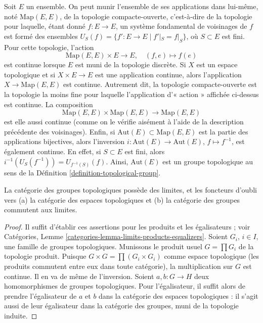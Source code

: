\begin{example}
\label{example-automorphisms-of-a-set}
Soit $E$ un ensemble. On peut munir l'ensemble de ses applications dans
lui-même, noté $\text{Map}(E, E)$, de la topologie compacte-ouverte,
c'est-à-dire de la topologie pour laquelle, étant donné $f : E \to E$, un
système fondamental de voisinages de $f$ est formé des ensembles
$U_S(f) = \{f' : E \to E \mid f'|_S = f|_S\}$, où $S \subset E$ est fini.
Pour cette topologie, l'action
$$
\text{Map}(E, E) \times E \longrightarrow E,\quad
(f, e) \longmapsto f(e)
$$
est continue lorsque $E$ est muni de la topologie discrète. Si $X$ est un
espace topologique et si $X \times E \to E$ est une application continue,
alors l'application $X \to \text{Map}(E, E)$ est continue. Autrement dit, la
topologie compacte-ouverte est la topologie la moins fine pour laquelle
l'application d'« action » affichée ci-dessus est continue. La composition
$$
\text{Map}(E, E) \times \text{Map}(E, E) \to \text{Map}(E, E)
$$
est elle aussi continue (comme on le vérifie aisément à l'aide de la
description précédente des voisinages). Enfin, si
$\text{Aut}(E) \subset \text{Map}(E, E)$ est la partie des applications
bijectives, alors l'inversion $i : \text{Aut}(E) \to \text{Aut}(E)$,
$f \mapsto f^{-1}$, est également continue. En effet, si $S \subset E$ est
fini, alors $i^{-1}(U_S(f^{-1})) = U_{f^{-1}(S)}(f)$. Ainsi,
$\text{Aut}(E)$ est un groupe topologique au sens de la
Définition \ref{definition-topological-group}.
\end{example}

\begin{lemma}
\label{lemma-topological-group-limits}
La catégorie des groupes topologiques possède des limites, et les foncteurs
d'oubli vers (a) la catégorie des espaces topologiques et (b) la catégorie des
groupes commutent aux limites.
\end{lemma}

\begin{proof}
Il suffit d'établir ces assertions pour les produits et les égalisateurs ;
voir Catégories, Lemme
\ref{categories-lemma-limits-products-equalizers}. Soient $G_i$, $i \in I$,
une famille de groupes topologiques. Munissons le produit usuel
$G = \prod G_i$ de la topologie produit. Puisque
$G \times G = \prod (G_i \times G_i)$ comme espace topologique (les produits
commutent entre eux dans toute catégorie), la multiplication sur $G$ est
continue. Il en va de même de l'inversion. Soient
$a, b : G \to H$ deux homomorphismes de groupes topologiques. Pour
l'égalisateur, il suffit alors de prendre l'égalisateur de $a$ et $b$ dans la
catégorie des espaces topologiques : il s'agit aussi de leur égalisateur dans
la catégorie des groupes, muni de la topologie induite.
\end{proof}


